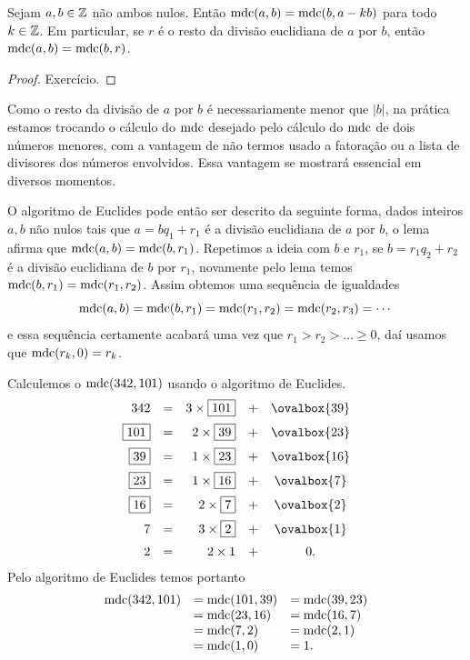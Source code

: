 \begin{lemma}
  \label{lemma:mdc}
  Sejam $a, b \in \mathbb{Z}$ não ambos nulos. Então
  $\operatorname{mdc}(a,b) = \operatorname{mdc}(b,a-kb)$ para todo $k \in \mathbb{Z}$.
  Em particular, se $r$ é o resto da divisão
  euclidiana de $a$ por $b$, então
  $\operatorname{mdc}(a,b) = \operatorname{mdc}(b,r)$.
\end{lemma}
\begin{proof}
  Exercício.
\end{proof}

Como o resto da divisão de $a$ por $b$ é necessariamente
menor que $|b|$, na prática estamos trocando o cálculo do $\operatorname{mdc}$
desejado pelo cálculo do $\operatorname{mdc}$ de dois números menores, com a
vantagem de não termos usado a fatoração ou a lista de divisores
dos números envolvidos. Essa vantagem se mostrará essencial
em diversos momentos.

O algoritmo de Euclides pode então ser descrito da seguinte forma, dados
inteiros $a, b$ não nulos tais que $a = bq_1 + r_1$ é a divisão
euclidiana de $a$ por $b$, o lema afirma que $\operatorname{mdc}(a,b) = \operatorname{mdc}(b,r_1)$.
Repetimos a ideia com $b$ e $r_1$, se $b = r_1q_2 + r_2$ é
a divisão euclidiana de $b$ por $r_1$, novamente pelo lema temos
$\operatorname{mdc}(b,r_1) = \operatorname{mdc}(r_1,r_2)$. Assim obtemos uma sequência
de igualdades
$$
  \operatorname{mdc}(a,b) = \operatorname{mdc}(b,r_1) = \operatorname{mdc}(r_1,r_2) = \operatorname{mdc}(r_2,r_3) = \cdots
$$
e essa sequência certamente acabará uma vez que
$r_1 > r_2 > \dots \geq 0$, daí usamos que $\operatorname{mdc}(r_k, 0) = r_k$.

\begin{example}\label{ex:mdceucl}
  Calculemos o $\operatorname{mdc}(342,101)$ usando o algoritmo de Euclides.
  $$
  \begin{array}{rcrcc}
    342 & = & 3\times \boxed{101} & + & \ovalbox{39} \\[.2cm]
    \boxed{101} & = & 2\times \boxed{39} & + & \ovalbox{23} \\[.2cm]
    \boxed{39} & = & 1 \times \boxed{23} & + & \ovalbox{16} \\[.2cm]
    \boxed{23} & = & 1 \times \boxed{16} & + & \ovalbox{7} \\[.2cm]
    \boxed{16} & = & 2 \times \boxed{7} & + & \ovalbox{2} \\[.2cm]
    7 & = & 3 \times \boxed{2} & + & \ovalbox{1} \\[.2cm]
    2 & = & 2\times   1 & + & 0.
  \end{array}
  $$
Pelo algoritmo de Euclides temos portanto
$$
\begin{array}{rll}
  \operatorname{mdc}(342,101) & = \operatorname{mdc}(101,39) & = \operatorname{mdc}(39,23) \\
          & = \operatorname{mdc}(23,16) & = \operatorname{mdc}(16,7) \\
          &  = \operatorname{mdc}(7,2) & = \operatorname{mdc}(2,1) \\
          & = \operatorname{mdc}(1,0) & = 1.  
\end{array}
$$
\end{example}

